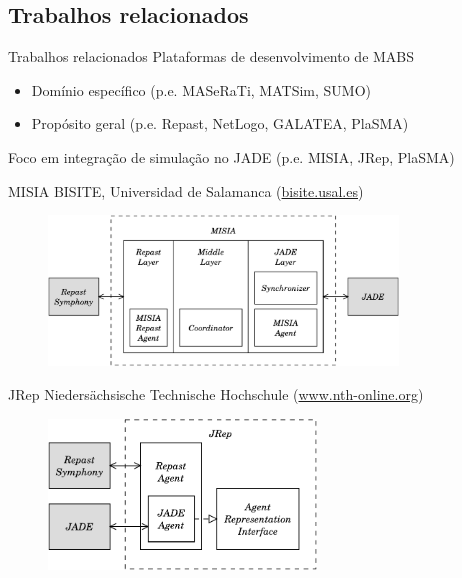 
\subsection{Trabalhos relacionados}
\begin{frame}{Trabalhos relacionados}
	Plataformas de desenvolvimento de MABS
	\begin{itemize}
		\item Domínio específico (p.e. MASeRaTi, MATSim, SUMO)
		\item Propósito geral (p.e. Repast, NetLogo, GALATEA, PlaSMA)
	\end{itemize}

	Foco em integração de simulação no JADE (p.e. MISIA, JRep, PlaSMA)
\end{frame}

\begin{frame}{MISIA}
	BISITE, Universidad de Salamanca (\url{bisite.usal.es})

	\begin{figure}
		\centering
		\includegraphics[height=4cm]{figures/MISIA.pdf}
	\end{figure}
\end{frame}

\begin{frame}{JRep}
	Niedersächsische Technische Hochschule (\url{www.nth-online.org})

	\begin{figure}
		\centering
		\includegraphics[height=4cm]{figures/jrep.pdf}
	\end{figure}
\end{frame}

